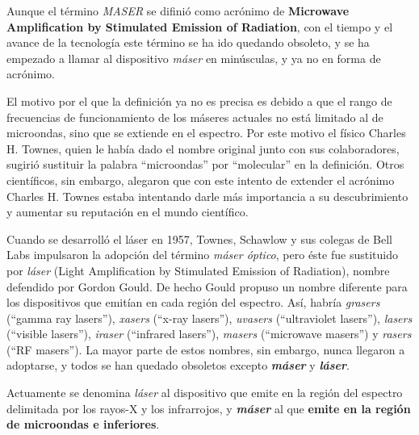 Aunque el t\'ermino \textit{MASER} se difini\'o como acr\'onimo de \textbf{Microwave Amplification by Stimulated Emission of Radiation}, con el tiempo y el avance de la tecnolog\'ia este t\'ermino se ha ido quedando obsoleto, y se ha empezado a llamar al dispositivo \textit{m\'aser} en min\'usculas, y ya no en forma de acr\'onimo. 

El motivo por el que la definici\'on ya no es precisa es debido a que el rango de frecuencias de funcionamiento de los m\'aseres actuales no est\'a limitado al de microondas, sino que se extiende en el espectro. Por este motivo el f\'isico Charles H. Townes, quien le hab\'ia dado el nombre original junto con sus colaboradores, sugiri\'o sustituir la palabra ``microondas'' por ``molecular'' en la definici\'on. Otros cient\'ificos, sin embargo, alegaron que con este intento de extender el acr\'onimo Charles H. Townes estaba intentando darle m\'as importancia a su descubrimiento y aumentar su reputaci\'on en el mundo cient\'ifico.

Cuando se desarroll\'o el l\'aser en 1957, Townes, Schawlow y sus colegas de Bell Labs impulsaron la adopci\'on del t\'ermino \textit{m\'aser \'optico}, pero \'este fue sustituido por \textit{l\'aser} (Light Amplification by Stimulated Emission of Radiation), nombre defendido por Gordon Gould. De hecho Gould propuso un nombre diferente para los dispositivos que emit\'ian en cada regi\'on del espectro. As\'i, habr\'ia \textit{grasers} (``gamma ray lasers''), \textit{xasers} (``x-ray lasers''), \textit{uvasers} (``ultraviolet lasers''), \textit{lasers} (``visible lasers''), \textit{iraser} (``infrared lasers''), \textit{masers} (``microwave masers'') y \textit{rasers} (``RF masers''). La mayor parte de estos nombres, sin embargo, nunca llegaron a adoptarse, y todos se han quedado obsoletos excepto \textit{\textbf{m\'aser}} y \textit{\textbf{l\'aser}}.

Actuamente se denomina \textit{l\'aser} al dispositivo que emite en la regi\'on del espectro delimitada por los rayos-X y los infrarrojos, y \textit{\textbf{m\'aser}} al que \textbf{emite en la regi\'on de microondas e inferiores}. 
